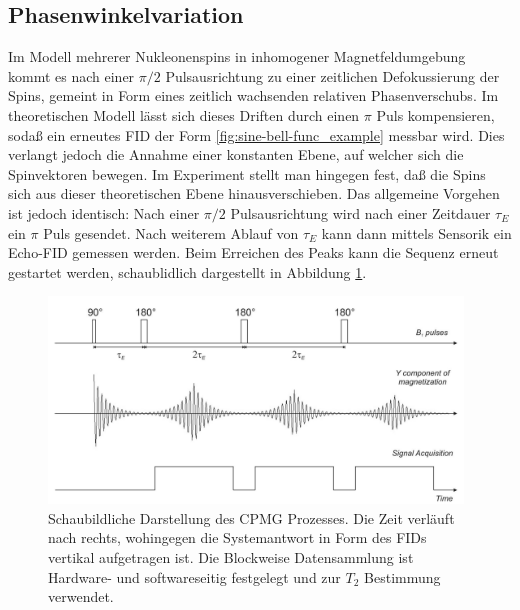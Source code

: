 \documentclass{article}
\begin{document}
    \subsection*{Phasenwinkelvariation}
        Im Modell mehrerer Nukleonenspins in inhomogener Magnetfeldumgebung kommt es nach einer $\pi/2$ Pulsausrichtung zu einer zeitlichen Defokussierung der Spins, gemeint in Form eines zeitlich wachsenden relativen Phasenverschubs. Im theoretischen Modell lässt sich dieses Driften durch einen $\pi$ Puls kompensieren, sodaß ein erneutes FID der Form \ref{fig:sine-bell-func_example} messbar wird. Dies verlangt jedoch die Annahme einer konstanten Ebene, auf welcher sich die Spinvektoren bewegen. Im Experiment stellt man hingegen fest, daß die Spins sich aus dieser theoretischen Ebene hinausverschieben. Das allgemeine Vorgehen ist jedoch identisch: Nach einer $\pi/2$ Pulsausrichtung wird nach einer Zeitdauer $\tau_E$ ein $\pi$ Puls gesendet. Nach weiterem Ablauf von $\tau_E$ kann dann mittels Sensorik ein Echo-FID gemessen werden. Beim Erreichen des Peaks kann die Sequenz erneut gestartet werden, schaublidlich dargestellt in Abbildung \ref{fig:CPMG-Prozess}.
        \begin{figure}[H]
            \centering
            \includegraphics[width=11cm]{../Bilddateien/CPMG_Prozess.png}
            \caption{Schaubildliche Darstellung des CPMG Prozesses. Die Zeit verläuft nach rechts, wohingegen die Systemantwort in Form des FIDs vertikal aufgetragen ist. Die Blockweise Datensammlung ist Hardware- und softwareseitig festgelegt und zur $T_2$ Bestimmung verwendet. \cite[ch 5.3.1]{doc:EFNMRStudentManual}}
            \label{fig:CPMG-Prozess}
        \end{figure}
\end{document}
